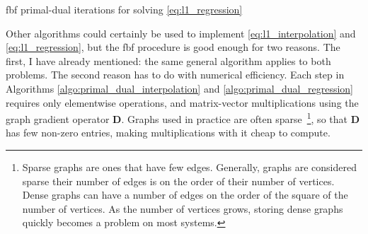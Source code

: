 \begin{algorithm}[H]
    \caption{\acrshort{fbf} primal-dual iterations for solving \eqref{eq:l1_regression}}
    \label{algo:primal_dual_regression}
    \begin{algorithmic}[1]
        \Repeat





	\end{algorithmic}
\end{algorithm}

Other algorithms could certainly be used to implement \eqref{eq:l1_interpolation} and \eqref{eq:l1_regression}, but the \acrshort{fbf} procedure is good enough for two reasons. The first, I have already mentioned: the same general algorithm applies to both problems. The second reason has to do with numerical efficiency. Each step in Algorithms \ref{algo:primal_dual_interpolation} and \ref{algo:primal_dual_regression} requires only elementwise operations, and matrix-vector multiplications using the graph gradient operator $\mathbf{D}$. Graphs used in practice are often sparse~\footnote{Sparse graphs are ones that have few edges. Generally, graphs are considered sparse their number of edges is on the order of their number of vertices. Dense graphs can have a number of edges on the order of the square of the number of vertices. As the number of vertices grows, storing dense graphs quickly becomes a problem on most systems.}, so that $\mathbf{D}$ has few non-zero entries, making multiplications with it cheap to compute.


